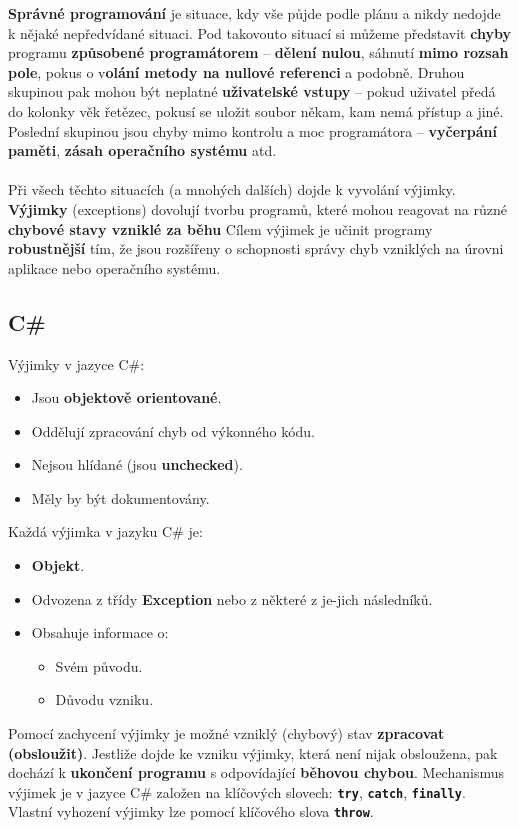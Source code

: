 \textbf{Správné programování} je situace, kdy vše půjde podle plánu a nikdy nedojde k nějaké nepředvídané situaci. Pod takovouto situací si můžeme představit \textbf{chyby} programu \textbf{způsobené programátorem} – \textbf{dělení nulou}, sáhnutí \textbf{mimo rozsah pole}, pokus o v\textbf{olání metody na nullové referenci} a podobně. Druhou skupinou pak mohou být neplatné \textbf{uživatelské vstupy} – pokud uživatel předá do kolonky věk řetězec, pokusí se uložit soubor někam, kam nemá přístup a jiné. Poslední skupinou jsou chyby mimo kontrolu a moc programátora – \textbf{vyčerpání paměti}, \textbf{zásah operačního systému} atd.
\\\\
Při všech těchto situacích (a mnohých dalších) dojde k vyvolání výjimky. \textbf{Výjimky} (exceptions) dovolují tvorbu programů, které mohou reagovat na různé \textbf{chybové stavy vzniklé za běhu} Cílem výjimek je učinit programy \textbf{robustnější} tím, že jsou rozšířeny o schopnosti správy chyb vzniklých na úrovni aplikace nebo operačního systému.

\subsection{C\#}
Výjimky v jazyce C\#:
\begin{itemize}
\item Jsou \textbf{objektově orientované}.
\item Oddělují zpracování chyb od výkonného kódu.
\item Nejsou hlídané (jsou \textbf{unchecked}).
\item Měly by být dokumentovány.
\end{itemize}

Každá výjimka v jazyku C\# je:
\begin{itemize}
\item \textbf{Objekt}.
\item Odvozena z třídy \textbf{Exception} nebo z některé z je-jich následníků.
\item Obsahuje informace o:
\begin{itemize}
\item Svém původu.
\item Důvodu vzniku.
\end{itemize}
\end{itemize}

Pomocí zachycení výjimky je možné vzniklý (chybový) stav \textbf{zpracovat (obsloužit)}. Jestliže dojde ke vzniku výjimky, která není nijak obsloužena, pak dochází k \textbf{ukončení programu} s odpovídající \textbf{běhovou chybou}. Mechanismus výjimek je v jazyce C\# založen na klíčových slovech: \texttt{\textbf{try}}, \texttt{\textbf{catch}}, \texttt{\textbf{finally}}. Vlastní vyhození výjimky lze pomocí klíčového slova \textbf{\texttt{throw}}.

